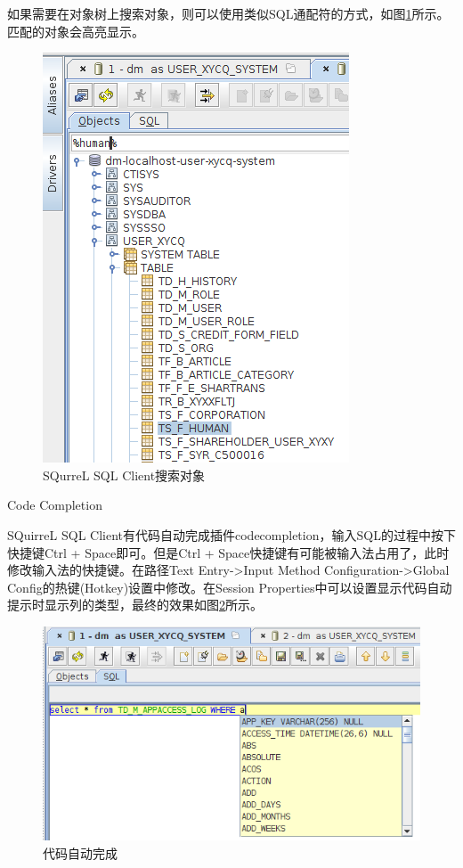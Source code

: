 \documentclass[12pt]{book}
\makeatletter
\numberwithin{dummy}{section}
\theoremstyle{ocrenumbox}
\theoremstyle{blacknumex}
\theoremstyle{blacknumbox}
\theoremstyle{ocrenum}
\renewcommand\paragraph{\@startsection{paragraph}{4}{\z@}
	{-2ex \@plus-.2ex \@minus .2ex}
	{.1ex}
	{\normalfont\small\sffamily\bfseries}}
\makeatother
\begin{document}
如果需要在对象树上搜索对象，则可以使用类似SQL通配符的方式，如图\ref{fig:searchobject}所示。匹配的对象会高亮显示。

\begin{figure}[htbp]
	\centering
	\includegraphics[scale=0.4]{searchobject.png}
	\caption{SQurreL SQL Client搜索对象}
	\label{fig:searchobject}
\end{figure}




\paragraph{Code Completion}

SQuirreL SQL Client有代码自动完成插件codecompletion，输入SQL的过程中按下快捷键Ctrl + Space即可。但是Ctrl + Space快捷键有可能被输入法占用了，此时修改输入法的快捷键。在路径Text Entry->Input Method Configuration->Global Config的热键(Hotkey)设置中修改。在Session Properties中可以设置显示代码自动提示时显示列的类型，最终的效果如图\ref{fig:codeautocompletion}所示。

\begin{figure}[htbp]
	\centering
	\includegraphics[scale=0.5]{codeautocompletion.png}
	\caption{代码自动完成}
	\label{fig:codeautocompletion}
\end{figure}
\end{document}
